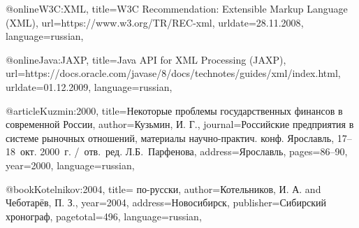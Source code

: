 @online{W3C:XML,
  title={W3C Recommendation: Extensible Markup Language (XML)},
  url={https://www.w3.org/TR/REC-xml},
  urldate={28.11.2008},
  language={russian},
}

@online{Java:JAXP,
  title={Java API for XML Processing (JAXP)},
  url={https://docs.oracle.com/javase/8/docs/technotes/guides/xml/index.html},
  urldate={01.12.2009},
  language={russian},
}

@article{Kuzmin:2000,
  title={Некоторые проблемы государственных финансов в современной России},
  author={Кузьмин, И. Г.},
  journal={Российские предприятия в системе рыночных отношений, материалы научно-практич. конф. Ярославль, 17--18~окт. 2000~г. /~отв.~ред. Л.Б.~Парфенова},
  address={Ярославль},
  pages={86--90},
  year={2000},
  language={russian},
}

@book{Kotelnikov:2004,
  title={\LaTeXe{} по-русски},
  author={Котельников, И. А. and Чеботарёв, П. З.},
  year={2004},
  address={Новосибирск},
  publisher={Сибирский хронограф},
  pagetotal={496},
  language={russian},
}
